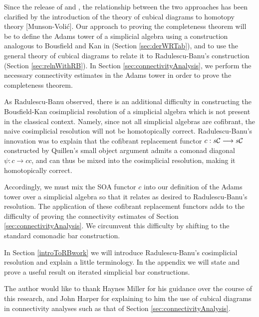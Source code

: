 \documentclass[11pt]{amsart}
\theoremstyle{plain}
\begin{document}
Since the release of \cite{BK_pairings.pdf} and \cite{BousKanSSeq.pdf}, the relationship between the two approaches has been clarified by the introduction of the theory of cubical diagrams to homotopy theory [Munson-Voli\'c]. Our approach to proving the completeness theorem will be to define the Adams tower of a simplicial algebra using a construction analogous to Bousfield and Kan in \cite{BK_pairings.pdf} (Section \ref{sec:derWRTab}), and to use the general theory of cubical diagrams to relate it to Radulescu-Banu's construction (Section \ref{sec:relnWithRB}). In Section \ref{sec:connectivityAnalysis}, we perform the necessary connectivity estimates in the Adams tower in order to prove the completeness theorem. 

As Radulescu-Banu observed, there is an additional difficulty in constructing the Bousfield-Kan cosimplicial resolution of a simplicial algebra which is not present in the classical context. Namely, since not all simplicial algebras are cofibrant, the naive cosimplicial resolution will not be homotopically correct. Radulescu-Banu's innovation was to explain that the cofibrant replacement functor $c:s\mathcal{C}\longrightarrow s\mathcal{C}$ constructed by Quillen's small object argument \cite{QuillenHomAlg.pdf} admits a comonad diagonal $\psi:c\to cc$, and can thus be mixed into the cosimplicial resolution, making it homotopically correct. 

Accordingly, we must mix the SOA functor $c$ into our definition of the Adams tower over a simplicial algebra so that it relates as desired to Radulescu-Banu's resolution. The application of these cofibrant replacement functors adds to the difficulty of proving the connectivity estimates of Section \ref{sec:connectivityAnalysis}. We circumvent this difficulty by shifting to the standard comonadic bar construction.

In Section \ref{introToRBwork} we will introduce Radulescu-Banu's cosimplicial resolution and explain a little terminology. In the appendix we will state and prove a useful result on iterated simplicial bar constructions.

The author would like to thank Haynes Miller for his guidance over the course of this research, and John Harper for explaining to him the use of cubical diagrams in connectivity analyses such as that of Section \ref{sec:connectivityAnalysis}.
\end{document}
